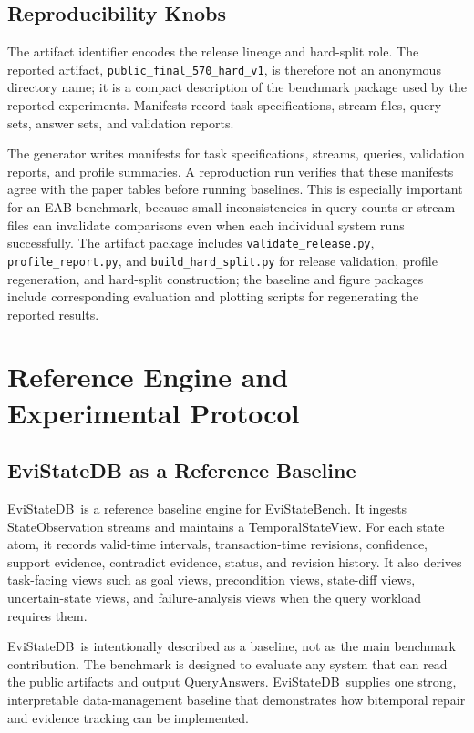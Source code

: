 \documentclass[conference]{IEEEtran}
\newcommand{\bench}{EviStateBench}
\newcommand{\engine}{EviStateDB}
\newcommand{\tsv}{TemporalStateView}
\begin{document}
\subsection{Reproducibility Knobs}

The artifact identifier encodes the release lineage and hard-split role. The reported artifact, \texttt{public\_final\_570\_hard\_v1}, is therefore not an anonymous directory name; it is a compact description of the benchmark package used by the reported experiments. Manifests record task specifications, stream files, query sets, answer sets, and validation reports.

The generator writes manifests for task specifications, streams, queries, validation reports, and profile summaries. A reproduction run verifies that these manifests agree with the paper tables before running baselines. This is especially important for an EAB benchmark, because small inconsistencies in query counts or stream files can invalidate comparisons even when each individual system runs successfully. The artifact package includes \texttt{validate\_release.py}, \texttt{profile\_report.py}, and \texttt{build\_hard\_split.py} for release validation, profile regeneration, and hard-split construction; the baseline and figure packages include corresponding evaluation and plotting scripts for regenerating the reported results.

\section{Reference Engine and Experimental Protocol}
\label{sec:protocol}

\subsection{EviStateDB as a Reference Baseline}

\engine\ is a reference baseline engine for \bench. It ingests StateObservation streams and maintains a \tsv. For each state atom, it records valid-time intervals, transaction-time revisions, confidence, support evidence, contradict evidence, status, and revision history. It also derives task-facing views such as goal views, precondition views, state-diff views, uncertain-state views, and failure-analysis views when the query workload requires them.

\engine\ is intentionally described as a baseline, not as the main benchmark contribution. The benchmark is designed to evaluate any system that can read the public artifacts and output QueryAnswers. \engine\ supplies one strong, interpretable data-management baseline that demonstrates how bitemporal repair and evidence tracking can be implemented.
\end{document}

